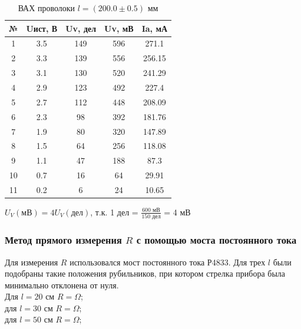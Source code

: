 \documentclass{article}
\begin{document}
	\begin{table}[H]
		\centering
		\begin{tabular}{|c|c|c|c|c|}
			\hline
			№ & Uист, В & Uv, дел & Uv, мВ & Ia, мА \\ \hline
			1 & 3.5 & 149 & 596 & 271.1 \\ \hline
			2 & 3.3 & 139 & 556 & 256.15 \\ \hline
			3 & 3.1 & 130 & 520 & 241.29 \\ \hline
			4 & 2.9 & 123 & 492 & 227.4 \\ \hline
			5 & 2.7 & 112 & 448 & 208.09 \\ \hline
			6 & 2.3 & 98 & 392 & 181.76 \\ \hline
			7 & 1.9 & 80 & 320 & 147.89 \\ \hline
			8 & 1.5 & 64 & 256 & 118.08 \\ \hline
			9 & 1.1 & 47 & 188 & 87.3 \\ \hline
			10 & 0.7 & 16 & 64 & 29.91 \\ \hline
			11 & 0.2 & 6 & 24 & 10.65 \\ \hline
		\end{tabular}
		\caption{ВАХ проволоки $l = (200.0 \pm 0.5)$ мм}
	\end{table}
	
	$U_{V} (\text{мВ}) = 4 U_{V} (\text{дел})$, т.к. 1 дел = $\frac{600 \text{ мВ}}{150 \text{ дел}}$ = 4 мВ
	
	\subsubsection{Метод прямого измерения $R$ с помощью моста постоянного тока}
	Для измерения $R$ использовался мост постоянного тока Р4833. Для трех $l$ были подобраны такие положения рубильников, при котором стрелка прибора была минимально отклонена от нуля.\\
	Для $l = 20 \text{ см}$ $R = \Omega$;\\
	для $l = 30 \text{ см}$ $R = \Omega$;\\
	для $l = 50 \text{ см}$ $R = \Omega$;\\
	
	
	
	
\end{document}
